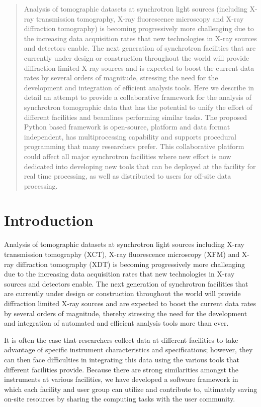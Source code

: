 \documentclass[pdf]{iucr}              %
\begin{document}
\begin{abstract}
Analysis of tomographic datasets at synchrotron light sources (including X-ray transmission tomography, X-ray fluorescence microscopy and X-ray diffraction tomography) is becoming progressively more challenging due to the increasing data acquisition rates that new technologies in X-ray sources and detectors enable. The next generation of synchrotron facilities that are currently under design or construction throughout the world will provide diffraction limited X-ray sources and is expected to boost the current data rates by several orders of magnitude, stressing the need for the development and integration of efficient analysis tools. Here we describe in detail an attempt to provide a collaborative framework for the analysis of synchrotron tomographic data that has the potential to unify the effort of different facilities and beamlines performing similar tasks. The proposed Python based framework is open-source, platform and data format independent, has multiprocessing capability and supports procedural programming that many researchers prefer. This collaborative platform could affect all major synchrotron facilities where new effort is now dedicated into developing new tools that can be deployed at the facility for real time processing, as well as distributed to users for off-site data processing.
\end{abstract}


\section{Introduction}

Analysis of tomographic datasets at synchrotron light sources including X-ray transmission tomography (XCT), X-ray fluorescence microscopy (XFM) and X-ray diffraction tomography (XDT)   \cite{banhart2008advanced} is becoming progressively more challenging  due to the increasing data acquisition rates that new technologies in X-ray sources and detectors enable. The next generation of synchrotron facilities that are currently under design or construction throughout the world will provide diffraction limited X-ray sources and are expected to boost the current data rates by several orders of magnitude, thereby stressing the need for the development and integration of automated and efficient analysis tools more than ever. 

It is often the case that researchers collect data at different facilities to take advantage of specific instrument characteristics and specifications; however, they can then face difficulties in integrating this data using the various tools that different facilities provide. Because there are strong similarities amongst the instruments at various facilities, we have developed a software framework in which each facility and user group can utilize and contribute to, ultimately saving on-site resources by sharing the computing tasks with the user community. 
\end{document}
